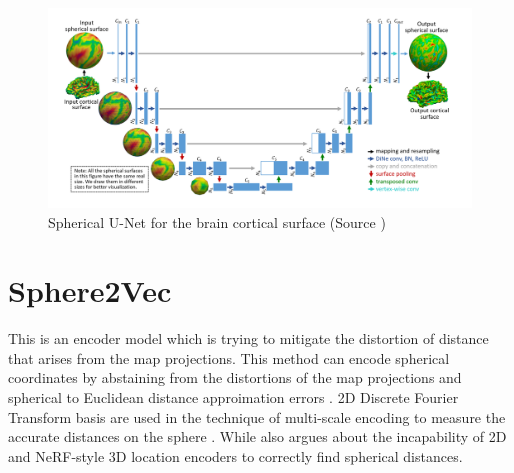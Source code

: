 \begin{figure}[h]
    \centering
    \includegraphics[width=1.0\linewidth]{figures/chapter-4/spherical_unet.png}
    \caption{Spherical U-Net for the brain cortical surface (Source \cite{zhao2019spherical}) }
    \label{fig:spherical-unet}
\end{figure}

\section{Sphere2Vec}
This is an encoder model which is trying to mitigate the distortion of distance that arises from the map projections. This method can encode spherical coordinates by abstaining from the distortions of the map projections and spherical to Euclidean distance approimation errors \cite{mai2023sphere2vec}. 2D Discrete Fourier Transform basis are used in the technique of multi-scale encoding to measure the accurate distances on the sphere \cite{mai2023sphere2vec}. While \cite{mai2023sphere2vec} also argues about the incapability of 2D and NeRF-style 3D location encoders to correctly find spherical distances.